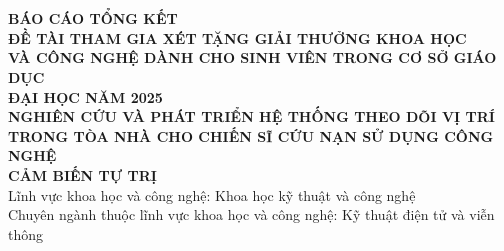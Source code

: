 \documentclass[a4paper]{article}
\begin{document}

\thispagestyle{empty}
\begin{center}
    \fontsize{13pt}{15pt}\\
    \vspace{-0.2cm}
    \\
    \vspace{3.2cm}
    \textbf{BÁO CÁO TỔNG KẾT}\\
    \vspace{1.5cm}
    \textbf{ĐỀ TÀI THAM GIA XÉT TẶNG GIẢI THƯỞNG KHOA HỌC}\\
    \textbf{VÀ CÔNG NGHỆ DÀNH CHO SINH VIÊN TRONG CƠ SỞ GIÁO DỤC}\\
    \textbf{ĐẠI HỌC NĂM 2025}\\
    \vspace{3.0cm}
    \textbf{NGHIÊN CỨU VÀ PHÁT TRIỂN HỆ THỐNG THEO DÕI VỊ TRÍ}\\
    \textbf{TRONG TÒA NHÀ CHO CHIẾN SĨ CỨU NẠN SỬ DỤNG CÔNG NGHỆ}\\
    \textbf{CẢM BIẾN TỰ TRỊ}\\
    \vspace{3.0cm}
    Lĩnh vực khoa học và công nghệ: Khoa học kỹ thuật và công nghệ\\
    Chuyên ngành thuộc lĩnh vực khoa học và công nghệ: Kỹ thuật điện tử và viễn thông
\end{center}

\pagebreak
\end{document}
